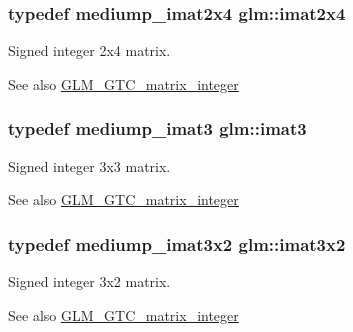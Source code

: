 \subsubsection[{imat2x4}]{\setlength{\rightskip}{0pt plus 5cm}typedef mediump\+\_\+imat2x4 {\bf glm\+::imat2x4}}\label{group__gtc__matrix__integer_gafe2d058e164fd1badace451ffcf4ae46}
Signed integer 2x4 matrix. \begin{DoxySeeAlso}{See also}
\hyperlink{group__gtc__matrix__integer}{G\+L\+M\+\_\+\+G\+T\+C\+\_\+matrix\+\_\+integer} 
\end{DoxySeeAlso}
\hypertarget{group__gtc__matrix__integer_ga45481922dd07a3a8e23758286311ee97}{}
\subsubsection[{imat3}]{\setlength{\rightskip}{0pt plus 5cm}typedef mediump\+\_\+imat3 {\bf glm\+::imat3}}\label{group__gtc__matrix__integer_ga45481922dd07a3a8e23758286311ee97}
Signed integer 3x3 matrix. \begin{DoxySeeAlso}{See also}
\hyperlink{group__gtc__matrix__integer}{G\+L\+M\+\_\+\+G\+T\+C\+\_\+matrix\+\_\+integer} 
\end{DoxySeeAlso}
\hypertarget{group__gtc__matrix__integer_ga04deef94cdfdd3b3b2706e10a32ef7f3}{}
\subsubsection[{imat3x2}]{\setlength{\rightskip}{0pt plus 5cm}typedef mediump\+\_\+imat3x2 {\bf glm\+::imat3x2}}\label{group__gtc__matrix__integer_ga04deef94cdfdd3b3b2706e10a32ef7f3}
Signed integer 3x2 matrix. \begin{DoxySeeAlso}{See also}
\hyperlink{group__gtc__matrix__integer}{G\+L\+M\+\_\+\+G\+T\+C\+\_\+matrix\+\_\+integer} 
\end{DoxySeeAlso}
\hypertarget{group__gtc__matrix__integer_gaeff9ef8f56cccc828d6b897923e75402}{}
